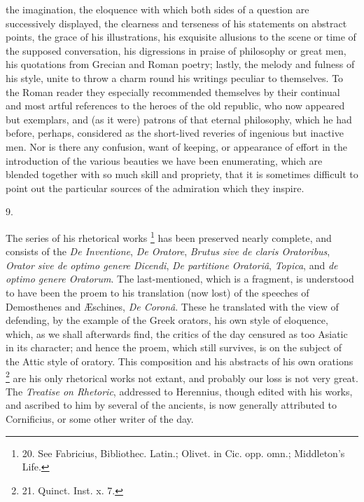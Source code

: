 the imagination, the eloquence with which both sides of a question are
successively displayed, the clearness and terseness of his statements
on abstract points, the grace of his illustrations, his exquisite
allusions to the scene or time of the supposed conversation, his
digressions in praise of philosophy or great men, his quotations from
Grecian and Roman poetry; lastly, the melody and fulness of his style,
unite to throw a charm round his writings peculiar to themselves. To
the Roman reader they especially recommended themselves by their
continual and most artful references to the heroes of the old
republic, who now appeared but exemplars, and (as it were) patrons of
that eternal philosophy, which he had before, perhaps, considered as
the short-lived reveries of ingenious but inactive men. Nor is there
any confusion, want of keeping, or appearance of effort in the
introduction of the various beauties we have been enumerating, which
are blended together with so much skill and propriety, that it is
sometimes difficult to point out the particular sources of the
admiration which they inspire.

9.

The series of his rhetorical
works \footnote{20. See Fabricius, Bibliothec.
Latin.; Olivet. in Cic. opp. omn.; Middleton's Life.} has been preserved nearly complete, and consists of the \emph{De
Inventione}, \emph{De Oratore}, \emph{Brutus sive de claris Oratoribus},
\emph{Orator sive de optimo genere Dicendi}, \emph{De partitione Oratoriâ},
\emph{Topica}, and \emph{de optimo genere Oratorum}. The
last-mentioned, which is a fragment, is understood to have been the
proem to his translation (now lost) of the speeches of Demosthenes and
Æschines, \emph{De Coronâ}. These he translated with the view of
defending, by the example of the Greek orators, his own style of
eloquence, which, as we shall afterwards find, the critics of the day
censured as too Asiatic in its character; and hence the proem, which
still survives, is on the subject of the Attic style of oratory. This
composition and his abstracts of his own orations \footnote{21. Quinct. Inst. x. 7.} are his
only rhetorical works not extant, and probably our loss is not very
great. The \emph{Treatise on Rhetoric}, addressed to Herennius, though
edited with his works, and ascribed to him by several of the ancients,
is now generally attributed to Cornificius, or some other writer of
the day.

